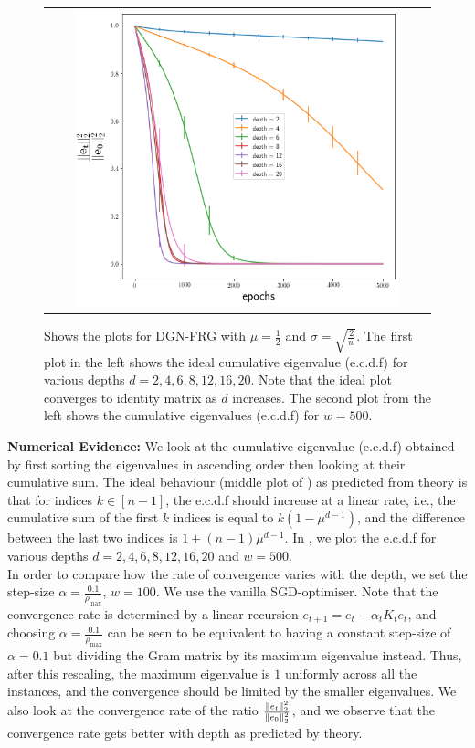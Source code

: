 \begin{figure}
{\begin{tabular}{ccccc}
&
&
\includegraphics[scale=0.4]{figs/dgn-fra-conv-w500.png}
\end{tabular}
}
\caption{Shows the plots for DGN-FRG with $\mu=\frac{1}{2}$ and $\sigma=\sqrt{\frac{2}{w}}$. The first plot in the left shows the ideal cumulative eigenvalue (e.c.d.f) for various depths $d=2,4,6,8,12,16,20$. Note that the ideal plot converges to identity matrix as $d$ increases. The second plot from the left shows the cumulative eigenvalues (e.c.d.f) for $w=500$. }
\label{fig:dgn-frg-gram-ecdf}
\end{figure}
\textbf{Numerical Evidence:} We look at the cumulative eigenvalue (e.c.d.f) obtained by first sorting the eigenvalues in ascending order then looking at their cumulative sum. The ideal behaviour (middle plot of ) as predicted from theory is that for indices $k\in[n-1]$, the e.c.d.f should increase at a linear rate, i.e., the cumulative sum of the first $k$ indices is equal to $k(1-\mu^{d-1})$, and the difference between the last two indices is $1+(n-1)\mu^{d-1}$. In , we plot the e.c.d.f for various depths $d=2,4,6,8,12,16,20$ and $w=500$. \hfill\\
In order to compare how the rate of convergence varies with the depth, we set the step-size $\alpha=\frac{0.1}{\rho_{\max}}$, $w=100$. We use the vanilla SGD-optimiser. Note that the convergence rate is determined by a linear recursion $e_{t+1}=e_t-\alpha_t K_te_t$, and choosing $\alpha=\frac{0.1}{\rho_{\max}}$ can be seen to be equivalent to having a constant step-size of $\alpha=0.1$ but dividing the Gram matrix by its maximum eigenvalue instead. Thus, after this rescaling, the maximum eigenvalue is $1$ uniformly across all the instances, and the convergence should be limited by the smaller eigenvalues. We also look at the convergence rate of the ratio $\frac{\|e_t\|^2_2}{\|e_0\|^2_2}$, and we observe that the convergence rate gets better with depth as predicted by theory.
